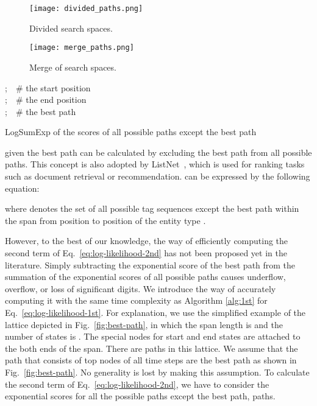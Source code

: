 \documentclass[11pt,a4paper]{article}
\def\figref#1{Fig.~\ref{#1}}
\def\equref#1{Eq.~\ref{#1}}
\begin{document}
\begin{figure*}[t]
\centering
\texttt{[image: divided\_paths.png]}
\caption{Divided search spaces.}
\label{fig:devided-paths}
\end{figure*}

\begin{figure}[t]
\centering
\texttt{[image: merge\_paths.png]}
\caption{Merge of search spaces.}
\label{fig:merged-paths}
\end{figure}

\begin{algorithm}[t]
\small
\;
;\ \ \# the start position \\
;\ \ \# the end position \\
;\ \ \# the best path \\
\For{; ; }{
  \;
}
\;
\ForEach{}{
  \;
}
\;
\For{; ; }{
  \ForEach{}{
    \ForEach{}{
      \;
    }
    \If{}{
      \ForEach{}{
        \;
      }
      \;
    }
  }
  \ForEach{}{
    \;
  }
  \;
}
\ForEach{}{
  \;
}
\;
\KwRet \;
\caption{LogSumExp of the scores of all possible paths except the best path}\label{alg:2nd}
\end{algorithm}

  given the best path can be calculated by excluding the best path from all possible paths.
This concept is also adopted by ListNet~\cite{cao2007}, which is used for ranking tasks such as document retrieval or recommendation.
 can be expressed by the following equation:

where  denotes the set of all possible tag sequences except the best path within the span from position  to position  of the entity type .

However, to the best of our knowledge, the way of efficiently computing the second term of \equref{eq:log-likelihood-2nd} has not been proposed yet in the literature.
Simply subtracting the exponential score of the best path from the summation of the exponential scores of all possible paths causes underflow, overflow, or loss of significant digits.
We introduce the way of accurately computing it with the same time complexity as Algorithm \ref{alg:1st} for \equref{eq:log-likelihood-1st}.
For explanation, we use the simplified example of the lattice depicted in \figref{fig:best-path}, in which the span length is  and the number of states is .
The special nodes for start and end states are attached to the both ends of the span.
There are  paths in this lattice.
We assume that the path that consists of top nodes of all time steps are the best path as shown in \figref{fig:best-path}.
No generality is lost by making this assumption.
To calculate the second term of \equref{eq:log-likelihood-2nd}, we have to consider the exponential scores for all the possible paths except the best path,  paths.
\end{document}
